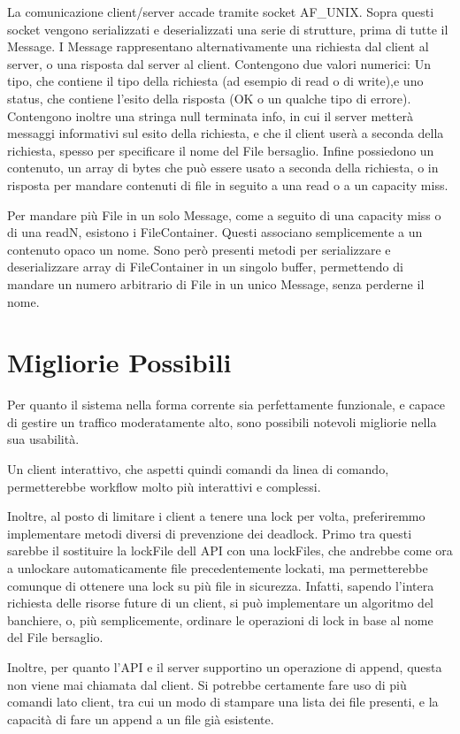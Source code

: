 \documentclass[11pt]{article}
\begin{document}
\begin{flushleft}
La comunicazione client/server accade tramite socket AF\_UNIX.
Sopra questi socket vengono serializzati e deserializzati una serie di strutture, prima di tutte il Message.
I Message rappresentano alternativamente una richiesta dal client al server, o una risposta dal server al client. Contengono due valori numerici: Un tipo, che contiene il tipo della richiesta (ad esempio di read o di write),e uno status, che contiene l'esito della risposta (OK o un qualche tipo di errore).
Contengono inoltre una stringa null terminata info, in cui il server metterà messaggi informativi sul esito della richiesta, e che il client userà a seconda della richiesta, spesso per specificare il nome del File bersaglio. Infine possiedono un contenuto, un array di bytes che può essere usato a seconda della richiesta, o in risposta per mandare contenuti di file in seguito a una read o a un capacity miss.

Per mandare più File in un solo Message, come a seguito di una capacity miss o di una readN, esistono i FileContainer. Questi associano semplicemente a un contenuto opaco un nome. Sono però presenti metodi per serializzare e deserializzare array di FileContainer in un singolo buffer, permettendo di mandare un numero arbitrario di File in un unico Message, senza perderne il nome.

\section{Migliorie Possibili}

Per quanto il sistema nella forma corrente sia perfettamente funzionale, e capace di gestire un traffico moderatamente alto, sono possibili notevoli migliorie nella sua usabilità.

Un client interattivo, che aspetti quindi comandi da linea di comando, permetterebbe workflow molto più interattivi e complessi.

Inoltre, al posto di limitare i client a tenere una lock per volta, preferiremmo implementare metodi diversi di prevenzione dei deadlock. Primo tra questi sarebbe il sostituire la lockFile dell API con una lockFiles, che andrebbe come ora a unlockare automaticamente file precedentemente lockati, ma permetterebbe comunque di ottenere una lock su più file in sicurezza. Infatti, sapendo l'intera richiesta delle risorse future di un client, si può implementare un algoritmo del banchiere, o, più semplicemente, ordinare le operazioni di lock in base al nome del File bersaglio.

Inoltre, per quanto l'API e il server supportino un operazione di append, questa non viene mai chiamata dal client. Si potrebbe certamente fare uso di più comandi lato client, tra cui un modo di stampare una lista dei file presenti, e la capacità di fare un append a un file già esistente.


\end{flushleft}
\end{document}
